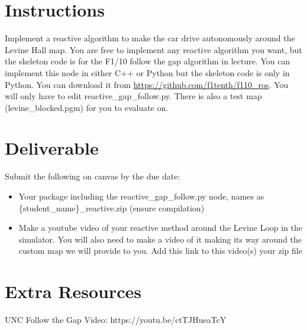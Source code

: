 \documentclass[a4 paper]{article}
\begin{document}
\section{Instructions}
Implement a reactive algorithm to make the car drive autonomously around the Levine Hall map. You are free to implement any reactive algorithm  you want, but the skeleton code is for the F1/10 follow the gap algorithm in lecture. You can implement this node in either C++ or Python but the skeleton code is only in Python. You can download it from \href{https://github.com/f1tenth/f110_ros}{https://github.com/f1tenth/f110\_ros}. You will only have to edit reactive\_gap\_follow.py. There is also a test map (levine\_blocked.pgm) for you to evaluate on.

\section{Deliverable}
Submit the following on canvas by the due date:
\begin{itemize}
    \item Your package including the reactive\_gap\_follow.py node, names as \{student\_name\}\_reactive.zip (ensure compilation)
    \item Make a youtube video of your reactive method around the Levine Loop in the simulator. You will also need to make a video of it making its way around the custom map we will provide to you. Add this link to this video(s) your zip file
\end{itemize}

\section{Extra Resources}
UNC Follow the Gap Video: https://youtu.be/ctTJHueaTcY
\end{document}
